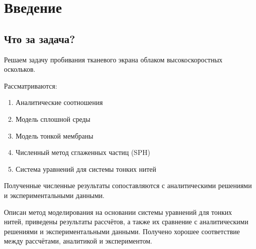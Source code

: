 \chapter{Введение}\label{ch:intro}

\section{Что за задача?}\label{sec:intro-problem}

Решаем задачу пробивания тканевого экрана облаком высокоскоростных оскольков.

Рассматриваются:

\begin{enumerate}
    \item Аналитические соотношения
    \item Модель сплошной среды
    \item Модель тонкой мембраны
    \item Численный метод сглаженных частиц (SPH)
    \item Система уравнений для системы тонких нитей
\end{enumerate}

Полученные численные результаты сопоставляются с аналитическими решениями и экспериментальными данными.

Описан метод моделирования на основании системы уравнений для тонких нитей,
приведены результаты рассчётов, а также  их сравнение с аналитическими решениями и экспериментальными данными.
Получено хорошее соответствие между рассчётами, аналитикой и экспериментом.
